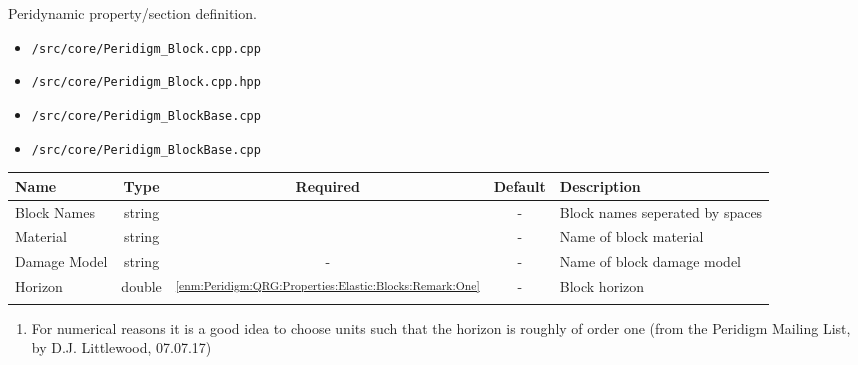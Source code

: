
\leveldown{\idxPDKwBlocks}
\label{sec:Peridigm:QRG:Properties:Blocks}
\myindex[\idxPDKeywordName]{\idxPDKwBlocks}


Peridynamic property/section definition.


\begin{itemize}[noitemsep]
  \item \verb+/src/core/Peridigm_Block.cpp.cpp+
  \item \verb+/src/core/Peridigm_Block.cpp.hpp+
  \item \verb+/src/core/Peridigm_BlockBase.cpp+
  \item \verb+/src/core/Peridigm_BlockBase.cpp+
\end{itemize}



\begin{tabularx}{\linewidth}{lcccX}
\toprule
Name		& Type		& Required	& Default	& Description		\\
\midrule
Block Names	& string	& \checkmark	& -		& Block names seperated by spaces		\\
Material\myindex[\idxPDKeywordName]{\idxPDKwMaterials}	& string	& \checkmark	& -		& Name of block material	\\
Damage Model\myindex[\idxPDKeywordName]{\idxPDKwDamageModels}	& string	& -		& -		& Name of block damage model	\\
Horizon\myindex[\idxPDKeywordName]{\idxPDKwHorizon}		& double	& \checkmark\textsuperscript{\ref{enm:Peridigm:QRG:Properties:Elastic:Blocks:Remark:One}}	& -		& Block horizon	\\
\bottomrule
\end{tabularx}


\begin{enumerate}[noitemsep]
  \item \label{enm:Peridigm:QRG:Properties:Elastic:Blocks:Remark:One} For numerical reasons it is a good idea to choose units such that the horizon is roughly of order one (from the Peridigm Mailing List, by D.J. Littlewood, 07.07.17)
\end{enumerate}



